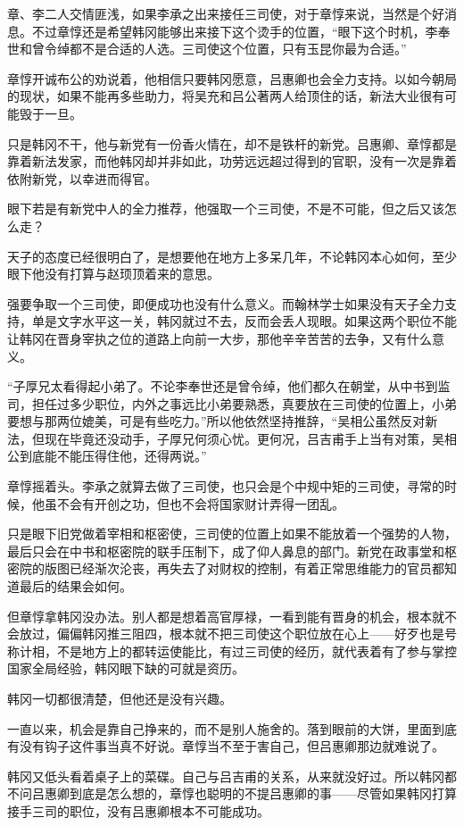 章、李二人交情匪浅，如果李承之出来接任三司使，对于章惇来说，当然是个好消息。不过章惇还是希望韩冈能够出来接下这个烫手的位置，“眼下这个时机，李奉世和曾令绰都不是合适的人选。三司使这个位置，只有玉昆你最为合适。”

章惇开诚布公的劝说着，他相信只要韩冈愿意，吕惠卿也会全力支持。以如今朝局的现状，如果不能再多些助力，将吴充和吕公著两人给顶住的话，新法大业很有可能毁于一旦。

只是韩冈不干，他与新党有一份香火情在，却不是铁杆的新党。吕惠卿、章惇都是靠着新法发家，而他韩冈却并非如此，功劳远远超过得到的官职，没有一次是靠着依附新党，以幸进而得官。

眼下若是有新党中人的全力推荐，他强取一个三司使，不是不可能，但之后又该怎么走？

天子的态度已经很明白了，是想要他在地方上多呆几年，不论韩冈本心如何，至少眼下他没有打算与赵顼顶着来的意思。

强要争取一个三司使，即便成功也没有什么意义。而翰林学士如果没有天子全力支持，单是文字水平这一关，韩冈就过不去，反而会丢人现眼。如果这两个职位不能让韩冈在晋身宰执之位的道路上向前一大步，那他辛辛苦苦的去争，又有什么意义。

“子厚兄太看得起小弟了。不论李奉世还是曾令绰，他们都久在朝堂，从中书到监司，担任过多少职位，内外之事远比小弟要熟悉，真要放在三司使的位置上，小弟要想与那两位媲美，可是有些吃力。”所以他依然坚持推辞，“吴相公虽然反对新法，但现在毕竟还没动手，子厚兄何须心忧。更何况，吕吉甫手上当有对策，吴相公到底能不能压得住他，还得两说。”

章惇摇着头。李承之就算去做了三司使，也只会是个中规中矩的三司使，寻常的时候，他虽不会有开创之功，但也不会将国家财计弄得一团乱。

只是眼下旧党做着宰相和枢密使，三司使的位置上如果不能放着一个强势的人物，最后只会在中书和枢密院的联手压制下，成了仰人鼻息的部门。新党在政事堂和枢密院的版图已经渐次沦丧，再失去了对财权的控制，有着正常思维能力的官员都知道最后的结果会如何。

但章惇拿韩冈没办法。别人都是想着高官厚禄，一看到能有晋身的机会，根本就不会放过，偏偏韩冈推三阻四，根本就不把三司使这个职位放在心上——好歹也是号称计相，不是地方上的都转运使能比，有过三司使的经历，就代表着有了参与掌控国家全局经验，韩冈眼下缺的可就是资历。

韩冈一切都很清楚，但他还是没有兴趣。

一直以来，机会是靠自己挣来的，而不是别人施舍的。落到眼前的大饼，里面到底有没有钩子这件事当真不好说。章惇当不至于害自己，但吕惠卿那边就难说了。

韩冈又低头看着桌子上的菜碟。自己与吕吉甫的关系，从来就没好过。所以韩冈都不问吕惠卿到底是怎么想的，章惇也聪明的不提吕惠卿的事——尽管如果韩冈打算接手三司的职位，没有吕惠卿根本不可能成功。

